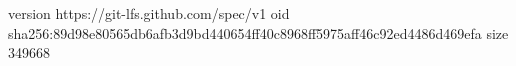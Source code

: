 version https://git-lfs.github.com/spec/v1
oid sha256:89d98e80565db6afb3d9bd440654ff40c8968ff5975aff46c92ed4486d469efa
size 349668
